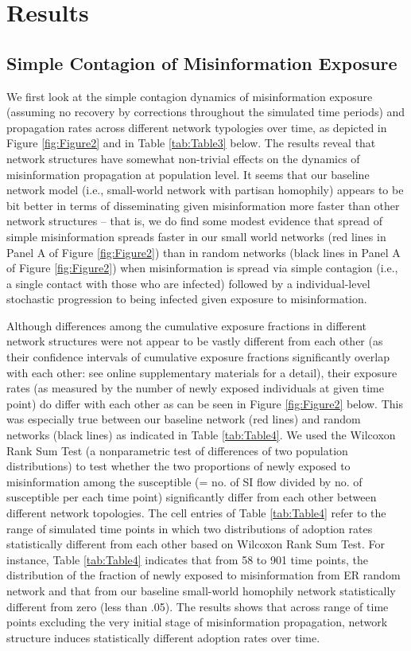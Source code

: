 \documentclass[man, 12pt, a4paper, nolmodern, noextraspace]{apa6}
\begin{document}
\section{Results}
\subsection{Simple Contagion of Misinformation Exposure}
	We first look at the simple contagion dynamics of misinformation exposure (assuming no recovery by corrections throughout the simulated time periods) and propagation rates across different network typologies over time, as depicted in Figure \ref{fig:Figure2} and in Table \ref{tab:Table3} below. The results reveal that network structures have somewhat non-trivial effects on the dynamics of misinformation propagation at population level. It seems that our baseline network model (i.e., small-world network with partisan homophily) appears to be bit better in terms of disseminating given misinformation more faster than other network structures -- that is, we do find some modest evidence that spread of simple misinformation spreads faster in our small world networks (red lines in Panel A of Figure \ref{fig:Figure2}) than in random networks (black lines in Panel A of Figure \ref{fig:Figure2}) when misinformation is spread via simple contagion (i.e., a single contact with those who are infected) followed by a individual-level stochastic progression to being infected given exposure to misinformation. 
    
    Although differences among the cumulative exposure fractions in different network structures were not appear to be vastly different from each other (as their confidence intervals of cumulative exposure fractions significantly overlap with each other: see online supplementary materials for a detail), their exposure rates (as measured by the number of newly exposed individuals at given time point) do differ with each other as can be seen in Figure \ref{fig:Figure2} below. This was especially true between our baseline network (red lines) and random networks (black lines) as indicated in Table \ref{tab:Table4}. We used the Wilcoxon Rank Sum Test (a nonparametric test of differences of two population distributions) to test whether the two proportions of newly exposed to misinformation among the susceptible (= no. of SI flow divided by no. of susceptible per each time point) significantly differ from each other between different network topologies. The cell entries of Table \ref{tab:Table4} refer to the range of simulated time points in which two distributions of adoption rates statistically different from each other based on Wilcoxon Rank Sum Test. For instance, Table \ref{tab:Table4} indicates that from 58 to 901 time points, the distribution of the fraction of newly exposed to misinformation from ER random network and that from our baseline small-world homophily network statistically different from zero (less than .05). The results shows that across range of time points excluding the very initial stage of misinformation propagation, network structure induces statistically different adoption rates over time.    
\end{document}
